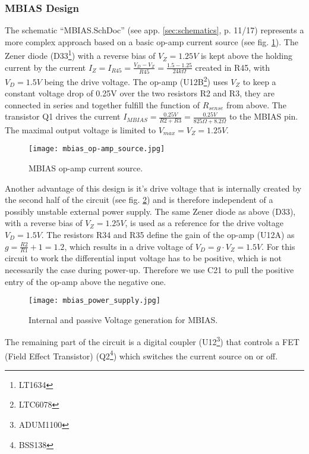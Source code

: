 \subsubsection{MBIAS Design}
\label{sec:mbias_design}
The schematic ``MBIAS.SchDoc'' (see app. \ref{sec:schematics}, p. 11/17) represents a more complex approach based on a basic op-amp current source (see fig. \ref{fig:mbias_op-amp_source}).
The Zener diode (D33\footnote{LT1634}) with a reverse bias of $V_Z = 1.25V$ is kept above the holding current by the current $I_Z = I_{R45} = \frac{V_D-V_Z}{R45} = \frac{1.5-1.25}{24k\Omega}$ created in R45, with $V_D = 1.5V$ being the drive voltage.
The op-amp (U12B\footnote{LTC6078}) uses $V_Z$ to keep a constant voltage drop of 0.25V over the two resistors R2 and R3, they are connected in series and together fulfill the function of $R_{sense}$ from above.
The transistor Q1 drives the current $I_{MBIAS} = \frac{0.25V}{R2+R3} = \frac{0.25V}{825\Omega+8.2\Omega}$ to the MBIAS pin.
The maximal output voltage is limited to $V_{max} = V_Z = 1.25V$.
\begin{figure}[H]
    \centering
    \texttt{[image: mbias\_op-amp\_source.jpg]}
    \caption[MBIAS Op-amp Current Source]{MBIAS op-amp current source.}
    \label{fig:mbias_op-amp_source}
\end{figure}

Another advantage of this design is it's drive voltage that is internally created by the second half of the circuit (see fig. \ref{fig:mbias_power_supply}) and is therefore independent of a possibly unstable external power supply.
The same Zener diode as above (D33), with a reverse bias of $V_Z = 1.25V$, is used as a reference for the drive voltage $V_D = 1.5V$.
The resistors R34 and R35 define the gain of the op-amp (U12A) as $g = \frac{R2}{R1}+1 = 1.2$, which results in a drive voltage of $V_D = g\cdot V_Z = 1.5V$.
For this circuit to work the differential input voltage has to be positive, which is not necessarily the case during power-up.
Therefore we use C21 to pull the positive entry of the op-amp above the negative one.
\begin{figure}[H]
    \centering
    \texttt{[image: mbias\_power\_supply.jpg]}
    \caption[MBIAS Voltage Generation]{Internal and passive Voltage generation for MBIAS.}
    \label{fig:mbias_power_supply}
\end{figure}

The remaining part of the circuit is a digital coupler (U12\footnote{ADUM1100}) that controls a FET (Field Effect Transistor) (Q2\footnote{BSS138}) which switches the current source on or off.

